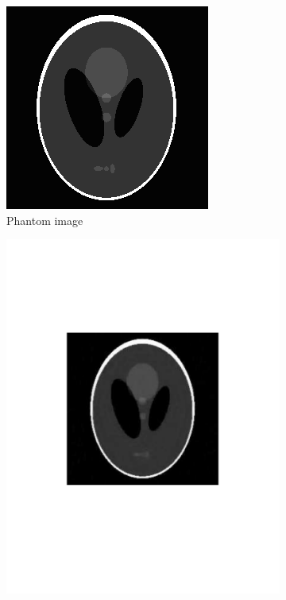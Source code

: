 \begin{figure}[!htb] \centering
    \begin{subfigure}{0.45\linewidth}
    	\centering
        \includegraphics[width=0.9\linewidth]{./figs/phantom_img}
         \caption{Phantom image}\label{fig:pds_a}		
        \label{fig:a}
    \end{subfigure} %
    \quad
    \begin{subfigure}{0.45\linewidth}
    	\centering
        \includegraphics[width=0.9\linewidth]{./figs/phantom_pds_img}

\end{subfigure}
\end{figure}

